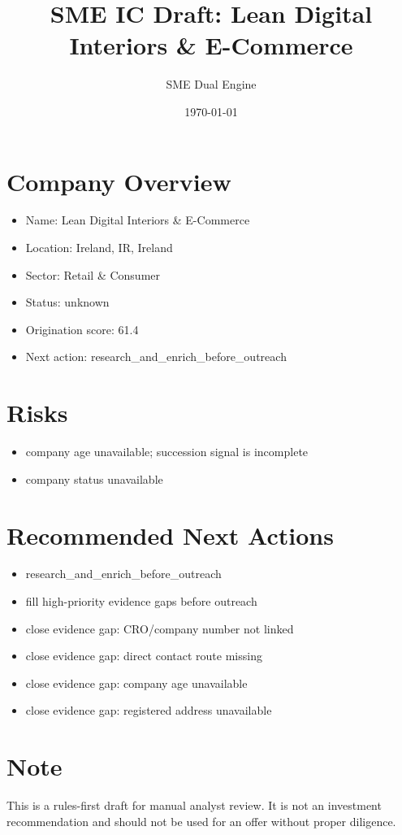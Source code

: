 \documentclass[11pt,a4paper]{article}
\title{SME IC Draft: Lean Digital Interiors \& E-Commerce}
\author{SME Dual Engine}
\date{\today}
\begin{document}
\maketitle
\section*{Company Overview}
\begin{itemize}[leftmargin=1.4em]
\item Name: Lean Digital Interiors \& E-Commerce
\item Location: Ireland, IR, Ireland
\item Sector: Retail \& Consumer
\item Status: unknown
\item Origination score: 61.4
\item Next action: research\_and\_enrich\_before\_outreach
\end{itemize}
\section*{Risks}
\begin{itemize}[leftmargin=1.4em]
\item company age unavailable; succession signal is incomplete
\item company status unavailable
\end{itemize}
\section*{Recommended Next Actions}
\begin{itemize}[leftmargin=1.4em]
\item research\_and\_enrich\_before\_outreach
\item fill high-priority evidence gaps before outreach
\item close evidence gap: CRO/company number not linked
\item close evidence gap: direct contact route missing
\item close evidence gap: company age unavailable
\item close evidence gap: registered address unavailable
\end{itemize}
\section*{Note}
This is a rules-first draft for manual analyst review. It is not an investment
recommendation and should not be used for an offer without proper diligence.
\end{document}
